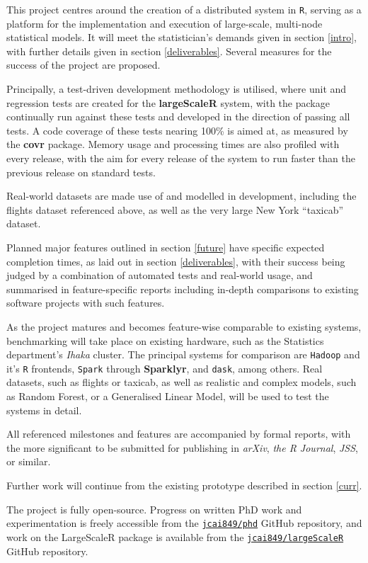 This project centres around the creation of a distributed system in \texttt{R}, serving as a platform for the implementation and execution of large-scale, multi-node statistical models.
It will meet the statistician's demands given in section \ref{intro}, with further details given in section \ref{deliverables}.
Several measures for the success of the project are proposed.

Principally, a test-driven development methodology is utilised, where unit and regression tests are created for the \textbf{largeScaleR} system, with the package continually run against these tests and developed in the direction of passing all tests.
A code coverage of these tests nearing 100\% is aimed at, as measured by the \textbf{covr} package.
Memory usage and processing times are also profiled with every release, with the aim for every release of the system to run faster than the previous release on standard tests.

Real-world datasets are made use of and modelled in development, including the flights dataset referenced above, as well as the very large New York ``taxicab'' dataset\cite{tlc2021trips}.

Planned major features outlined in section \ref{future} have specific expected completion times, as laid out in section \ref{deliverables}, with their success being judged by a combination of automated tests and real-world usage, and summarised in feature-specific reports including in-depth comparisons to existing software projects with such features.

As the project matures and becomes feature-wise comparable to existing systems, benchmarking will take place on existing hardware, such as the Statistics department's \textit{Ihaka} cluster. 
The principal systems for comparison are \texttt{Hadoop} and it's \texttt{R} frontends, \texttt{Spark} through \textbf{Sparklyr}, and \texttt{dask}, among others.
Real datasets, such as flights or taxicab, as well as realistic and complex models, such as Random Forest, or a Generalised Linear Model, will be used to test the systems in detail.

All referenced milestones and features are accompanied by formal reports, with the more significant to be submitted for publishing in \textit{arXiv}, \textit{the R Journal}, \textit{JSS}, or similar.

Further work will continue from the existing prototype described in section \ref{curr}.

The project is fully open-source.
Progress on written PhD work and experimentation is freely accessible from the \href{https://github.com/jcai849/phd}{\texttt{jcai849/phd}} GitHub repository, and work on the LargeScaleR package is available from the \href{https://github.com/jcai849/phd}{\texttt{jcai849/largeScaleR}} GitHub repository\cite{cairns2020largescaler}.
